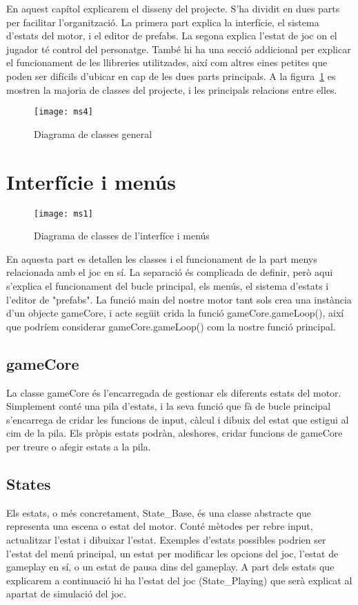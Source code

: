 En aquest capítol explicarem el disseny del projecte. 
S'ha dividit en dues parts per facilitar l'organització. 
La primera part explica la interfície, el sistema d'estats del motor, i el editor de prefabs. 
La segona explica l'estat de joc on el jugador té control del personatge. 
També hi ha una secció addicional per explicar el funcionament de les llibreries utilitzades, així com altres eines petites que poden ser difícils d'ubicar en cap de les dues parts principals.
A la figura~\ref{dc_general} es mostren la majoria de classes del projecte, i les principals relacions entre elles.
\begin{figure}[!h]
  \texttt{[image: ms4]}
  \caption{Diagrama de classes general}
  \label{dc_general}
\end{figure}
\section{Interfície i menús}
\begin{figure}[!h]
  \texttt{[image: ms1]}
  \caption{Diagrama de classes de l'interfíce i menús}
  \label{dc_menu}
\end{figure}
En aquesta part es detallen les classes i el funcionament de la part menys relacionada amb el joc en sí. La separació és complicada de definir, però aqui s'explica el funcionament del bucle principal, els menús, el sistema d'estats i l'editor de "prefabs". 
La funció main del nostre motor tant sols crea una instància d'un objecte gameCore, i acte següit crida la funció gameCore.gameLoop(), així que podríem considerar gameCore.gameLoop() com la nostre funció principal.
\subsection{gameCore}
La classe gameCore és l'encarregada de gestionar els diferents estats del motor. 
Simplement conté una pila d'estats, i la seva funció que fà de bucle principal s'encarrega de cridar les funcions de input, càlcul i dibuix del estat que estigui al cim de la pila.
Els pròpis estats podràn, aleshores, cridar funcions de gameCore per treure o afegir estats a la pila.

\subsection{States}
Els estats, o més concretament, State\_Base, és una classe abstracte que representa una escena o estat del motor. Conté mètodes per rebre input, actualitzar l'estat i dibuixar l'estat.
Exemples d'estats possibles podrien ser l'estat del menú principal, un estat per modificar les opcions del joc, l'estat de gameplay en sí, o un estat de pausa dins del gameplay.
A part dels estats que explicarem a continuació hi ha l'estat del joc (State\_Playing) que serà explicat al apartat de simulació del joc.

